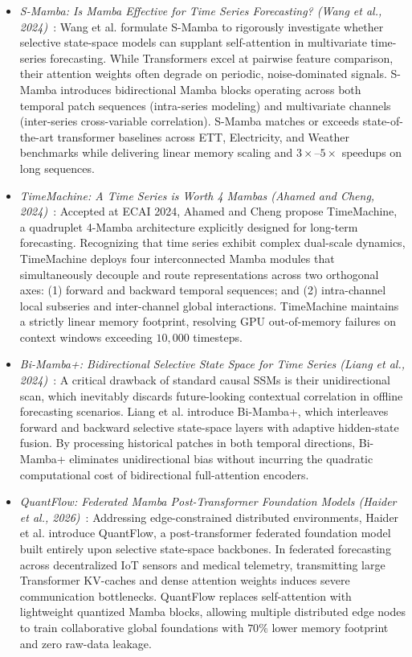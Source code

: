 \begin{itemize}[leftmargin=*]
    \item \emph{S-Mamba: Is Mamba Effective for Time Series Forecasting? (Wang et al., 2024)}~\cite{wang2024smamba}: Wang et al. formulate S-Mamba to rigorously investigate whether selective state-space models can supplant self-attention in multivariate time-series forecasting. While Transformers excel at pairwise feature comparison, their attention weights often degrade on periodic, noise-dominated signals. S-Mamba introduces bidirectional Mamba blocks operating across both temporal patch sequences (intra-series modeling) and multivariate channels (inter-series cross-variable correlation). S-Mamba matches or exceeds state-of-the-art transformer baselines across ETT, Electricity, and Weather benchmarks while delivering linear memory scaling and $3\times\text{--}5\times$ speedups on long sequences.
    \item \emph{TimeMachine: A Time Series is Worth 4 Mambas (Ahamed and Cheng, 2024)}~\cite{ahamed2024timemachine}: Accepted at ECAI 2024, Ahamed and Cheng propose TimeMachine, a quadruplet 4-Mamba architecture explicitly designed for long-term forecasting. Recognizing that time series exhibit complex dual-scale dynamics, TimeMachine deploys four interconnected Mamba modules that simultaneously decouple and route representations across two orthogonal axes: (1) forward and backward temporal sequences; and (2) intra-channel local subseries and inter-channel global interactions. TimeMachine maintains a strictly linear memory footprint, resolving GPU out-of-memory failures on context windows exceeding $10,000$ timesteps.
    \item \emph{Bi-Mamba+: Bidirectional Selective State Space for Time Series (Liang et al., 2024)}~\cite{liang2024bimamba}: A critical drawback of standard causal SSMs is their unidirectional scan, which inevitably discards future-looking contextual correlation in offline forecasting scenarios. Liang et al. introduce Bi-Mamba+, which interleaves forward and backward selective state-space layers with adaptive hidden-state fusion. By processing historical patches in both temporal directions, Bi-Mamba+ eliminates unidirectional bias without incurring the quadratic computational cost of bidirectional full-attention encoders.
    \item \emph{QuantFlow: Federated Mamba Post-Transformer Foundation Models (Haider et al., 2026)}~\cite{haider2026quantflow}: Addressing edge-constrained distributed environments, Haider et al. introduce QuantFlow, a post-transformer federated foundation model built entirely upon selective state-space backbones. In federated forecasting across decentralized IoT sensors and medical telemetry, transmitting large Transformer KV-caches and dense attention weights induces severe communication bottlenecks. QuantFlow replaces self-attention with lightweight quantized Mamba blocks, allowing multiple distributed edge nodes to train collaborative global foundations with $70\%$ lower memory footprint and zero raw-data leakage.
\end{itemize}

